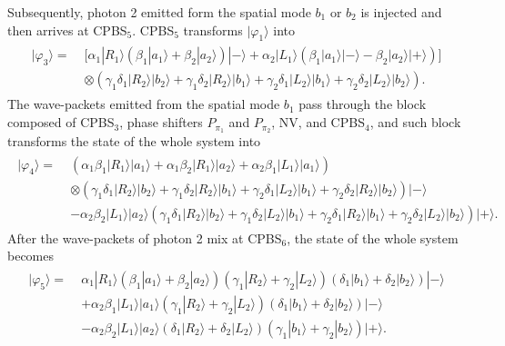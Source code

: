 \documentclass[showpacs,preprintnumbers,showkeys,amsmath,amssymb]{revtex4}%
\begin{document}
Subsequently, photon 2 emitted form the spatial mode $b_1$ or $b_2$ is injected and then arrives at CPBS$_5$. CPBS$_5$ transforms $|\varphi_1\rangle$ into
\begin{eqnarray}       \label{eq15}
\begin{split}
|\varphi_3\rangle=\;&
\big[\alpha_{1}|R_1\rangle (\beta_{1}|a_1\rangle + \beta_{2}|a_2\rangle)|-\rangle
%
+\alpha_{2}|L_1\rangle(\beta_{1}|a_1\rangle |-\rangle - \beta_{2}|a_2\rangle|+\rangle)\big] \\&\otimes
(\gamma_{1}\delta_{1}|R_2\rangle|b_2\rangle + \gamma_{1}\delta_{2}|R_2\rangle|b_1\rangle
 +\gamma_{2}\delta_{1}|L_2\rangle|b_1\rangle + \gamma_{2}\delta_{2}|L_2\rangle|b_2\rangle).
\end{split}
\end{eqnarray}
The wave-packets emitted from the spatial mode $b_1$ pass through the block composed of CPBS$_3$, phase shifters $P_{\pi_1}$  and $P_{\pi_2}$, NV, and CPBS$_4$, and such block transforms the state of the whole system into
\begin{eqnarray}       \label{eq16}
\begin{split}
|\varphi_4\rangle=\;&
(\alpha_{1}\beta_{1}|R_1\rangle|a_1\rangle+\alpha_{1}\beta_{2}|R_1\rangle|a_2\rangle+\alpha_{2}\beta_{1}|L_1\rangle|a_1\rangle)\\&\otimes
 (\gamma_{1}\delta_{1}|R_2\rangle|b_2\rangle+\gamma_{1}\delta_{2}|R_2\rangle|b_1\rangle
+ \gamma_{2}\delta_{1}|L_2\rangle|b_1\rangle+\gamma_{2}\delta_{2}|R_2\rangle|b_2\rangle)|-\rangle\\&
%
-\alpha_{2}\beta_{2}|L_1\rangle|a_2\rangle
(\gamma_{1}\delta_{1}|R_2\rangle|b_2\rangle
+\gamma_{1}\delta_{2}|L_2\rangle|b_1\rangle
+\gamma_{2}\delta_{1}|R_2\rangle|b_1\rangle
+\gamma_{2}\delta_{2}|L_2\rangle|b_2\rangle)|+\rangle.
\end{split}
\end{eqnarray}
After the wave-packets of  photon 2 mix at CPBS$_6$, the state of the whole system becomes
\begin{eqnarray}       \label{eq17}
\begin{split}
|\varphi_5\rangle=\;&
\alpha_{1}|R_1\rangle(\beta_{1}|a_1\rangle+\beta_{2}|a_2\rangle)(\gamma_{1}|R_2\rangle+\gamma_{2}|L_2\rangle)(\delta_{1}|b_1\rangle+\delta_{2}|b_2\rangle)|-\rangle\\&
%
+\alpha_{2}\beta_{1}|L_1\rangle|a_1\rangle(\gamma_{1}|R_2\rangle+\gamma_{2}|L_2\rangle)(\delta_{1}|b_1\rangle+\delta_{2}|b_2\rangle)|-\rangle\\&
%
-\alpha_{2}\beta_{2}|L_1\rangle|a_2\rangle(\delta_{1}|R_2\rangle+\delta_{2}|L_2\rangle)(\gamma_{1}|b_1\rangle+\gamma_{2}|b_2\rangle)|+\rangle.
\end{split}
\end{eqnarray}
\end{document}
